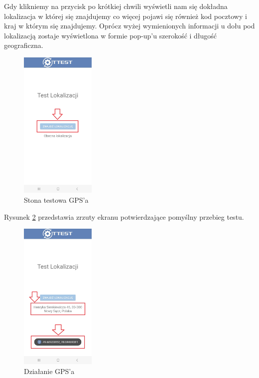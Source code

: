Gdy klikniemy na przycisk po krótkiej chwili wyświetli nam się dokładna lokalizacja w której się znajdujemy co więcej pojawi się również kod pocztowy i kraj w którym się znajdujemy. Oprócz wyżej wymienionych informacji u dołu pod lokalizacją zostaje wyświetlona w formie pop-up'u szerokość i długość geograficzna.

\newpage

\begin{figure}[!hbt]
	\begin{center}
		\includegraphics[angle=360, width=0.32\textwidth]{rys/punkt6/gps}
		\caption{Stona testowa GPS'a}
		\label{rys:gps}
	\end{center}
\end{figure}

Rysunek \ref{rys:gps1} przedstawia zrzuty ekranu potwierdzające pomyślny przebieg testu.

\begin{figure}[!hbt]
	\begin{center}
		\includegraphics[angle=360, width=0.32\textwidth]{rys/punkt6/gps1}
		\caption{Działanie GPS'a}
		\label{rys:gps1}
	\end{center}
\end{figure}

